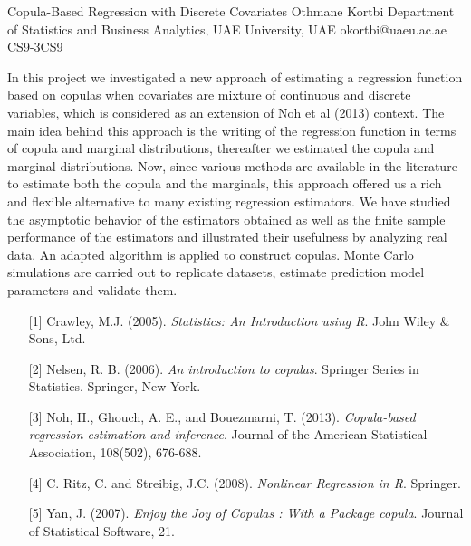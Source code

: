 \begin{talk}
\end{talk}

\begin{talk}
  {Copula-Based Regression with Discrete Covariates}%
  {Othmane Kortbi}%
  {Department of Statistics and Business Analytics, UAE University, UAE}%
  {okortbi@uaeu.ac.ae}%
  {} %
{}{}{CS9-3}{CS9}


In this project we investigated a new approach of estimating a regression function
based on copulas when covariates are mixture of continuous and discrete variables,
which is considered as an extension of Noh et al (2013) context. 
The main idea behind this approach is the writing of the regression function in terms of copula and marginal distributions,
thereafter we estimated the copula and marginal distributions. Now, since various 
methods are available in the literature to estimate both the copula and the marginals, this
approach offered us a rich and 
flexible alternative to many existing regression estimators.
We have studied the asymptotic behavior of the estimators obtained as well as the finite
sample performance of the estimators and illustrated their usefulness by analyzing real
data. An adapted algorithm is applied to construct copulas. Monte Carlo simulations are carried out 
to replicate datasets, estimate prediction model parameters and validate them.
 
\medskip


\begin{enumerate}

	
	\item[{[1]}] Crawley, M.J. (2005). {\it Statistics: An Introduction using R}. John Wiley \& Sons, Ltd.
	
	\item[{[2]}]Nelsen, R. B. (2006). {\it An introduction to copulas}. Springer Series in Statistics. Springer, New York.
	
	\item[{[3]}] Noh, H., Ghouch, A. E., and Bouezmarni, T. (2013). {\it Copula-based regression estimation and inference}. Journal of the American Statistical Association, 108(502), 676-688.
	
	\item[{[4]}] C. Ritz, C. and Streibig, J.C. (2008). {\it Nonlinear Regression in R}. Springer.

\item[{[5]}] Yan, J. (2007). {\it Enjoy the Joy of Copulas : With a Package copula}. Journal of Statistical Software, 21.

\end{enumerate}

\end{talk}


